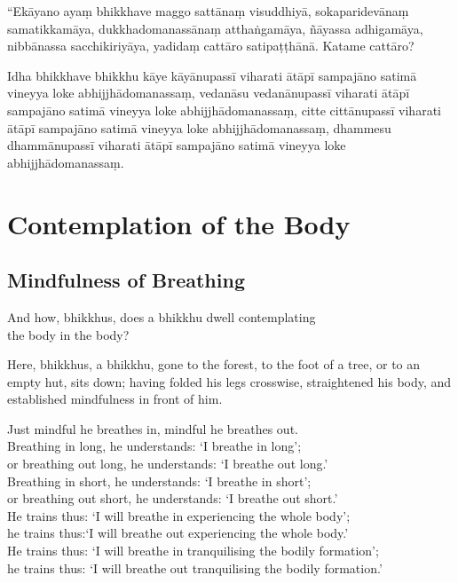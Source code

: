 “Ekāyano ayaṃ bhikkhave maggo sattānaṃ visuddhiyā, sokaparidevānaṃ
samatikkamāya, dukkhadomanassānaṃ atthaṅgamāya, ñāyassa adhigamāya, nibbānassa
sacchikiriyāya, yadidaṃ cattāro satipaṭṭhānā. Katame cattāro?

Idha bhikkhave bhikkhu kāye kāyānupassī viharati ātāpī sampajāno satimā vineyya
loke abhijjhādomanassaṃ, vedanāsu vedanānupassī viharati ātāpī sampajāno satimā
vineyya loke abhijjhādomanassaṃ, citte cittānupassī viharati ātāpī sampajāno
satimā vineyya loke abhijjhādomanassaṃ, dhammesu dhammānupassī viharati ātāpī
sampajāno satimā vineyya loke abhijjhādomanassaṃ.


\englishPage
\chapter{Contemplation of the Body}

\section{Mindfulness of Breathing}

And how, bhikkhus, does a bhikkhu dwell contemplating\\
the body in the body?

Here, bhikkhus, a bhikkhu, gone to the forest, to the foot of a tree, or to an
empty hut, sits down; having folded his legs crosswise, straightened his body,
and established mindfulness in front of him.

Just mindful he breathes in, mindful he breathes out.\\
Breathing in long, he understands: ‘I breathe in long’;\\
or breathing out long, he understands: ‘I breathe out long.’\\
Breathing in short, he understands: ‘I breathe in short’;\\
or breathing out short, he understands: ‘I breathe out short.’\\
He trains thus: ‘I will breathe in experiencing the whole body’;\\
he trains thus:‘I will breathe out experiencing the whole body.’\\
He trains thus: ‘I will breathe in tranquilising the bodily formation’;\\
he trains thus: ‘I will breathe out tranquilising the bodily formation.’

